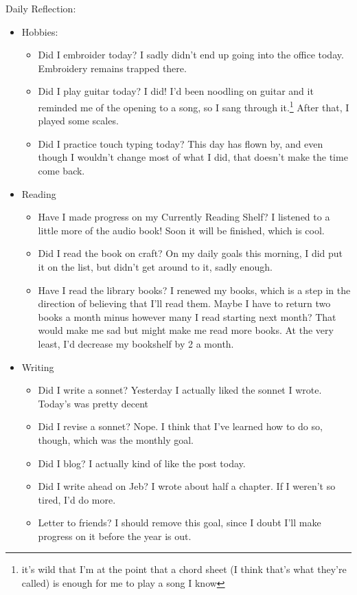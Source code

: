 \documentclass[12pt]{article}[titlepage]
\newcommand{\1}{\={a}}
\newcommand{\2}{\={e}}
\newcommand{\3}{\={\i}}
\newcommand{\4}{\=o}
\newcommand{\5}{\=u}
\newcommand{\6}{\={A}}
\renewcommand{\,}{\textsuperscript{,}}
\begin{document}
Daily Reflection:
\begin{itemize}
\item Hobbies:
\begin{itemize}
\item Did I embroider today? I sadly didn't end up going into the office today. Embroidery remains trapped there.
\item Did I play guitar today? I did! I'd been noodling on guitar and it reminded me of the opening to a song, so I sang through it.\footnote{it's wild that I'm at the point that a chord sheet (I think that's what they're called) is enough for me to play a song I know} After that, I played some scales.
\item Did I practice touch typing today? This day has flown by, and even though I wouldn't change most of what I did, that doesn't make the time come back.
\end{itemize}
\item Reading
\begin{itemize}
\item Have I made progress on my Currently Reading Shelf? I listened to a little more of the audio book! Soon it will be finished, which is cool.
\item Did I read the book on craft? On my daily goals this morning, I did put it on the list, but didn't get around to it, sadly enough.
\item Have I read the library books? I renewed my books, which is a step in the direction of believing that I'll read them. Maybe I have to return two books a month minus however many I read starting next month? That would make me sad but might make me read more books. At the very least, I'd decrease my bookshelf by 2 a month.
\end{itemize}
\item Writing
\begin{itemize}
\item Did I write a sonnet? Yesterday I actually liked the sonnet I wrote. Today's was pretty decent
\item Did I revise a sonnet? Nope. I think that I've learned how to do so, though, which was the monthly goal.
\item Did I blog? I actually kind of like the post today.
\item Did I write ahead on Jeb? I wrote about half a chapter. If I weren't so tired, I'd do more.
\item Letter to friends? I should remove this goal, since I doubt I'll make progress on it before the year is out.

\end{itemize}
\end{itemize}
\end{document}
